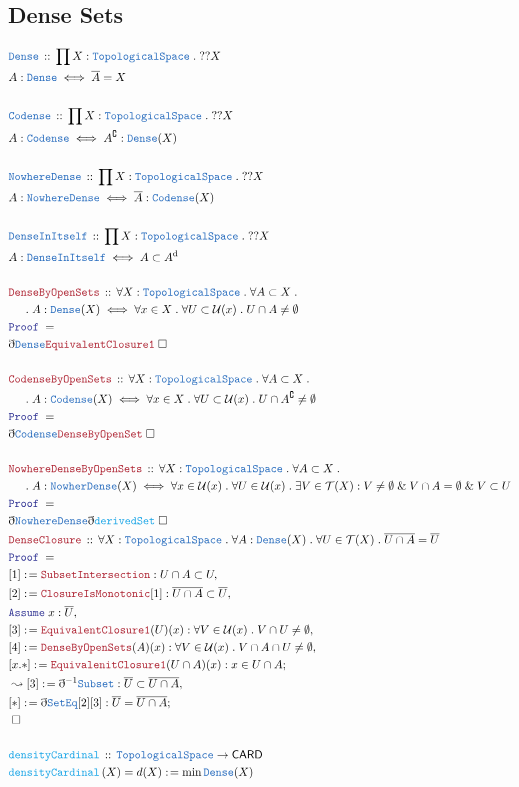 \documentclass[12pt]{scrartcl}
\newcommand{\TYPE}[1]{\textcolor{NavyBlue}{\mathtt{#1}}}
\newcommand{\FUNC}[1]{\textcolor{Cerulean}{\mathtt{#1}}}
\newcommand{\LOGIC}[1]{\textcolor{Blue}{\mathtt{#1}}}
\newcommand{\THM}[1]{\textcolor{Maroon}{\mathtt{#1}}}
\renewcommand{\.}{\; . \;}
\newcommand{\de}{: \kern 0.1pc =}
\newcommand{\Act}[1]{\left( #1 \right)}
\newcommand{\Theorem}[2]{& \THM{#1} \, :: \, #2 \\ & \Proof = \\ }
\newcommand{\DeclareType}[2]{& \TYPE{#1} \, :: \, #2 \\}
\newcommand{\DefineType}[3]{& #1 : \TYPE{#2} \iff #3 \\}
\newcommand{\DeclareFunc}[2]{& \FUNC{#1} \, :: \, #2 \\}
\newcommand{\DefineNamedFunc}[4]{&  \FUNC{#1}\Act{#2} = #3 \de #4 \\}
\newcommand{\NewLine}{\\ & \kern 1pc}
\newcommand{\Page}[1]{ \begin{align*} #1 \end{align*}   }
\newcommand{ \bd }{ \ByDef }
\renewcommand{\And}{\; \& \;}
\renewcommand{\c}{\complement}
\newcommand{\Say}[3]{& #1 \de #2 : #3, \\}
\newcommand{\Conclude}[3]{& #1 \de #2 : #3; \\}
\newcommand{\Derive}[3]{& \leadsto #1 \de #2 : #3, \\}
\newcommand{\Assume}[2]{& \LOGIC{Assume} \; #1 : #2, \\}
\newcommand{\QED}{\; \square}
\newcommand{\EndProof}{& \QED \\}
\newcommand{\ByDef}{\eth}
\newcommand{\Proof}{\LOGIC{Proof} \; }
\newcommand{\TS}{\TYPE{TopologicalSpace}}
\newcommand{\T}{\mathcal{T}}
\newcommand{\U}{\mathcal{U}}
\renewcommand{\d}{\mathrm{d}}
\begin{document}
\subsection{Dense Sets}
\Page{
	\DeclareType{Dense}{\prod X : \TS \. ??X}
	\DefineType{A}{Dense}{\overline{A} = X}
	\\
	\DeclareType{Codense}{\prod X : \TS \. ??X}
	\DefineType{A}{Codense}{A^\c : \TYPE{Dense}(X)}
	\\
	\DeclareType{NowhereDense}{\prod X : \TS \. ??X}
	\DefineType{A}{NowhereDense}{\overline{A} : \TYPE{Codense}(X)} 
	\\
	\DeclareType{DenseInItself}{\prod X : \TS \. ??X}
	\DefineType{A}{DenseInItself}{A \subset A^\d}
	\\
	\Theorem{DenseByOpenSets}
	{
		\forall X : \TS \. 
		\forall A \subset X \. \NewLine \. 
		A : \TYPE{Dense}(X) \iff \forall x \in X \. \forall U \subset \U(x) \. U \cap A \neq \emptyset
	}
	&  \bd \TYPE{Dense} \THM{EquivalentClosure1} \QED
	\\ \\
	\Theorem{CodenseByOpenSets}
	{
		\forall X : \TS \. 
		\forall A \subset X \. \NewLine \. 
		A : \TYPE{Codense}(X) \iff \forall x \in X \. \forall U \subset \U(x) 
		\. U \cap A^\c \neq \emptyset
	}
	&  \bd \TYPE{Codense} \THM{DenseByOpenSet} \QED
	\\ \\
	\Theorem{NowhereDenseByOpenSets}
	{
		\forall X : \TS \. 
		\forall A \subset X \. \NewLine \. 
		A : \TYPE{NowherDense}(X) \iff \forall x \in \U(x) \. 
		\forall U \in \U(x) \. 
		\exists V \in \T(X) :
		V \neq \emptyset \And V \cap A = \emptyset \And V \subset U
	}
	&  \bd \TYPE{NowhereDense} \bd \FUNC{derivedSet} \QED
	\\
	\Theorem{DenseClosure}
	{
		\forall X : \TS \.
		\forall A : \TYPE{Dense}(X) \.
		\forall U \in \T(X) \. 
		\overline{U \cap A} =  \overline{U}
	}
	\Say{[1]}{\THM{SubsetIntersection}}{U  \cap A \subset U}
	\Say{[2]}{\THM{ClosureIsMonotonic}[1]}{ \overline{U \cap A} \subset \overline{U}}
	\Assume{x}{\overline{U}}
	\Say{[3]}{\THM{EquivalentClosure1}(U)(x)}
	{\forall V \in \U(x) \. V \cap U \neq \emptyset }
	\Say{[4]}{\THM{DenseByOpenSets}(A)(x) }
	{\forall V \in \U(x) \. V \cap A \cap U \neq \emptyset }
	\Conclude{[x.*]}{\THM{EquivalenitClosure1}(U \cap A)(x)}
	{
		x \in U \cap A
	}
	\Derive{[3]}{\bd^{-1} \TYPE{Subset}}
	{
		\overline{U} \subset \overline{U \cap A}
	}
	\Conclude{[*]}{\bd \TYPE{SetEq}[2][3]}
	{
		\overline{U} = \overline{U \cap A}
	}
	\EndProof
	\\
	\DeclareFunc{densityCardinal}
	{
		\TS \to \mathsf{CARD} 
	}
	\DefineNamedFunc{densityCardinal}
	{X}{d(X)}{\min \TYPE{Dense}(X)}
}
\end{document}
